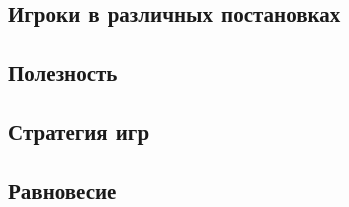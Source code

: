 
\subsection{Игроки в различных постановках}


\subsection{Полезность}



\subsection{Стратегия игр}


\subsection{Равновесие}

